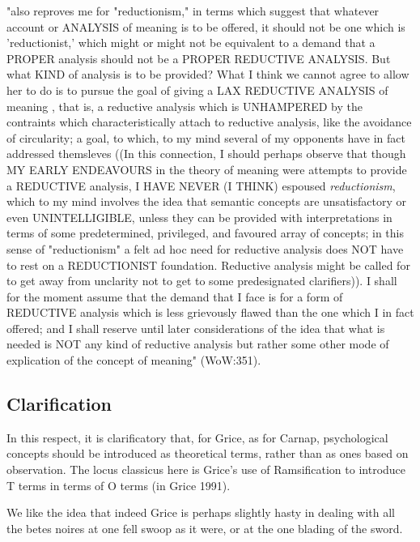 \documentclass[10pt,titlepage]{book}
\begin{document}
{"also reproves me for "reductionism," in terms which suggest that  whatever 
account or ANALYSIS of meaning is to be offered, it should not be one  
which is 'reductionist,' which might or might not be equivalent to a demand that 
 a PROPER analysis should not be a PROPER REDUCTIVE ANALYSIS. But what KIND 
of  analysis is to be provided? What I think we cannot agree to allow her 
to do is  to pursue the goal of giving a LAX REDUCTIVE ANALYSIS of meaning , 
that is, a  reductive analysis which is UNHAMPERED by the contraints which  
characteristically attach to reductive analysis, like the avoidance of  
circularity; a goal, to which, to my mind several of my opponents have in fact  
addressed themsleves ((In this connection, I should perhaps observe that 
though  MY EARLY ENDEAVOURS in the theory of meaning were attempts to provide a 
 REDUCTIVE analysis, I HAVE NEVER (I THINK) espoused {\it reductionism}, which 
to my  mind involves the idea that semantic concepts are unsatisfactory or 
even  UNINTELLIGIBLE, unless they can be provided with interpretations in 
terms of  some predetermined, privileged, and favoured array of concepts; in 
this sense of  "reductionism" a felt ad hoc need for reductive analysis does 
NOT have to rest  on a REDUCTIONIST foundation. Reductive analysis might be 
called for to get away  from unclarity not to get to some predesignated 
clarifiers)). I shall for the  moment assume that the demand that I face is for a 
form of REDUCTIVE analysis  which is less grievously flawed than the one 
which I in fact offered; and I  shall reserve until later considerations of 
the idea that what is needed is NOT  any kind of reductive analysis but rather 
some other mode of explication of the  concept of meaning" (WoW:351).

\subsection{Clarification}
 
In this respect, it is clarificatory that, for Grice, as for Carnap,  
psychological concepts should be introduced as theoretical terms, rather than  
as ones based on observation. The locus classicus here is Grice's use of  
Ramsification to introduce T terms in terms of O terms (in Grice 1991). 

We like the idea  that indeed Grice is perhaps slightly hasty in dealing 
with all the betes noires  at one fell swoop as it were, or at the one blading 
of the sword. 
 
}
\end{document}
